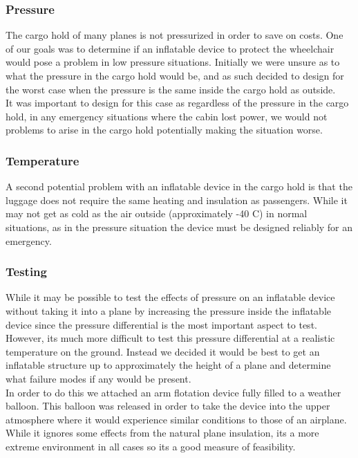 \subsubsection{Pressure}
The cargo hold of many planes is not pressurized in order to save on costs. One of our goals was to determine if an inflatable device to protect the wheelchair would pose a problem in low pressure situations. Initially we were unsure as to what the pressure in the cargo hold would be, and as such decided to design for the worst case when the pressure is the same inside the cargo hold as outside. \\

It was important to design for this case as regardless of the pressure in the cargo hold, in any emergency situations where the cabin lost power, we would not problems to arise in the cargo hold potentially making the situation worse.

\subsubsection{Temperature}
A second potential problem with an inflatable device in the cargo hold is that the luggage does not require the same heating and insulation as passengers. While it may not get as cold as the air outside (approximately -40 C) in normal situations, as in the pressure situation the device must be designed reliably for an emergency. \\

\subsubsection{Testing}
While it may be possible to test the effects of pressure on an inflatable device without taking it into a plane by increasing the pressure inside the inflatable device since the pressure differential is the most important aspect to test. However, its much more difficult to test this pressure differential at a realistic temperature on the ground. Instead we decided it would be best to get an inflatable structure up to approximately the height of a plane and determine what failure modes if any would be present. \\

In order to do this we attached an arm flotation device fully filled to a weather balloon. This balloon was released in order to take the device into the upper atmosphere where it would experience similar conditions to those of an airplane. While it ignores some effects from the natural plane insulation, its a more extreme environment in all cases so its a good measure of feasibility. \\

